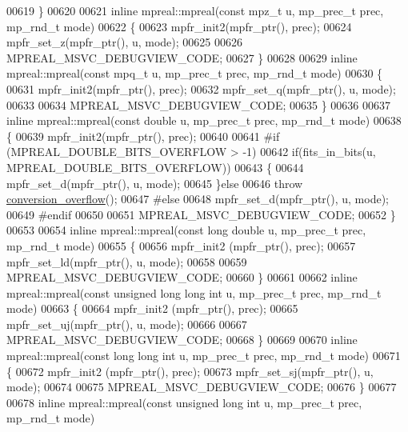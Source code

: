 \begin{DoxyCode}
00619 \}
00620 
00621 \textcolor{keyword}{inline} mpreal::mpreal(\textcolor{keyword}{const} mpz\_t u, mp\_prec\_t prec, mp\_rnd\_t mode)
00622 \{
00623     mpfr\_init2(mpfr\_ptr(), prec);
00624     mpfr\_set\_z(mpfr\_ptr(), u, mode);
00625 
00626     MPREAL\_MSVC\_DEBUGVIEW\_CODE;
00627 \}
00628 
00629 \textcolor{keyword}{inline} mpreal::mpreal(\textcolor{keyword}{const} mpq\_t u, mp\_prec\_t prec, mp\_rnd\_t mode)
00630 \{
00631     mpfr\_init2(mpfr\_ptr(), prec);
00632     mpfr\_set\_q(mpfr\_ptr(), u, mode);
00633 
00634     MPREAL\_MSVC\_DEBUGVIEW\_CODE;
00635 \}
00636 
00637 \textcolor{keyword}{inline} mpreal::mpreal(\textcolor{keyword}{const} \textcolor{keywordtype}{double} u, mp\_prec\_t prec, mp\_rnd\_t mode)
00638 \{
00639      mpfr\_init2(mpfr\_ptr(), prec);
00640 
00641 \textcolor{preprocessor}{#if (MPREAL\_DOUBLE\_BITS\_OVERFLOW > -1)}
00642   \textcolor{keywordflow}{if}(fits\_in\_bits(u, MPREAL\_DOUBLE\_BITS\_OVERFLOW))
00643   \{
00644     mpfr\_set\_d(mpfr\_ptr(), u, mode);
00645   \}\textcolor{keywordflow}{else}
00646     \textcolor{keywordflow}{throw} \hyperlink{classmpfr_1_1conversion__overflow}{conversion\_overflow}();
00647 \textcolor{preprocessor}{#else}
00648   mpfr\_set\_d(mpfr\_ptr(), u, mode);
00649 \textcolor{preprocessor}{#endif}
00650 
00651     MPREAL\_MSVC\_DEBUGVIEW\_CODE;
00652 \}
00653 
00654 \textcolor{keyword}{inline} mpreal::mpreal(\textcolor{keyword}{const} \textcolor{keywordtype}{long} \textcolor{keywordtype}{double} u, mp\_prec\_t prec, mp\_rnd\_t mode)
00655 \{
00656     mpfr\_init2 (mpfr\_ptr(), prec);
00657     mpfr\_set\_ld(mpfr\_ptr(), u, mode);
00658 
00659     MPREAL\_MSVC\_DEBUGVIEW\_CODE;
00660 \}
00661 
00662 \textcolor{keyword}{inline} mpreal::mpreal(\textcolor{keyword}{const} \textcolor{keywordtype}{unsigned} \textcolor{keywordtype}{long} \textcolor{keywordtype}{long} \textcolor{keywordtype}{int} u, mp\_prec\_t prec, mp\_rnd\_t mode)
00663 \{
00664     mpfr\_init2 (mpfr\_ptr(), prec);
00665     mpfr\_set\_uj(mpfr\_ptr(), u, mode);
00666 
00667     MPREAL\_MSVC\_DEBUGVIEW\_CODE;
00668 \}
00669 
00670 \textcolor{keyword}{inline} mpreal::mpreal(\textcolor{keyword}{const} \textcolor{keywordtype}{long} \textcolor{keywordtype}{long} \textcolor{keywordtype}{int} u, mp\_prec\_t prec, mp\_rnd\_t mode)
00671 \{
00672     mpfr\_init2 (mpfr\_ptr(), prec);
00673     mpfr\_set\_sj(mpfr\_ptr(), u, mode);
00674 
00675     MPREAL\_MSVC\_DEBUGVIEW\_CODE;
00676 \}
00677 
00678 \textcolor{keyword}{inline} mpreal::mpreal(\textcolor{keyword}{const} \textcolor{keywordtype}{unsigned} \textcolor{keywordtype}{long} \textcolor{keywordtype}{int} u, mp\_prec\_t prec, mp\_rnd\_t mode)

\end{DoxyCode}
